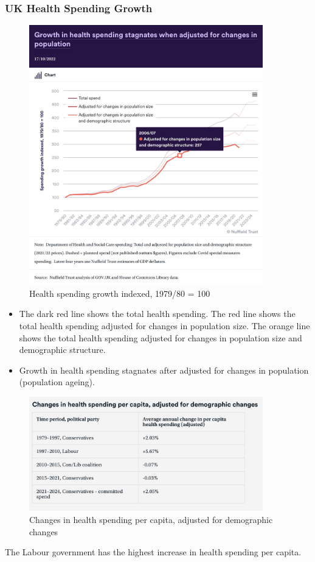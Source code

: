        \subsubsection{UK Health Spending Growth} 
            \begin{figure}[H]
                \centering
                \includegraphics[width=4in]{images/ch3/8.png}
                \caption{Health spending growth indexed, 1979/80 = 100}
            \end{figure} 
            \begin{itemize}           
                \item The dark red line shows the total health spending. The red line shows the total health spending adjusted for changes in population size. The orange line shows the total health spending adjusted for changes in population size and demographic structure.
                \item Growth in health spending stagnates after adjusted for changes in population (population ageing).
            \end{itemize}       
            \begin{figure}[H]
                \centering
                \includegraphics[width=4in]{images/ch3/9.png}
                \caption{Changes in health spending per capita, adjusted for demographic changes}
            \end{figure} 
            The Labour government has the highest increase in health spending per capita.

